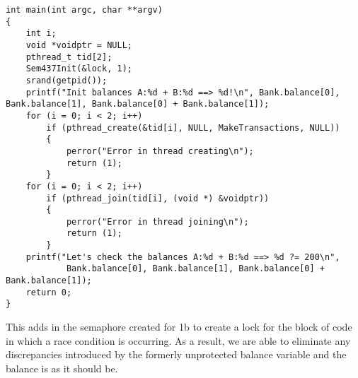 \documentclass[12pt, a4paper, oneside]{article}
\begin{document}
\begin{lstlisting}
int main(int argc, char **argv) 
{
    int i;
    void *voidptr = NULL;
    pthread_t tid[2];
    Sem437Init(&lock, 1);
    srand(getpid());
    printf("Init balances A:%d + B:%d ==> %d!\n", Bank.balance[0], Bank.balance[1], Bank.balance[0] + Bank.balance[1]);
    for (i = 0; i < 2; i++)
        if (pthread_create(&tid[i], NULL, MakeTransactions, NULL)) 
        {
            perror("Error in thread creating\n");
            return (1);
        }
    for (i = 0; i < 2; i++)
        if (pthread_join(tid[i], (void *) &voidptr)) 
        {
            perror("Error in thread joining\n");
            return (1);
        }
    printf("Let's check the balances A:%d + B:%d ==> %d ?= 200\n",
            Bank.balance[0], Bank.balance[1], Bank.balance[0] + Bank.balance[1]);
    return 0;
}
\end{lstlisting}

This adds in the semaphore created for 1b to create a lock for the block of code in which a race condition is occurring. As a result, we are able to eliminate any discrepancies introduced by the formerly unprotected balance variable and the balance is as it should be.
\end{document}
